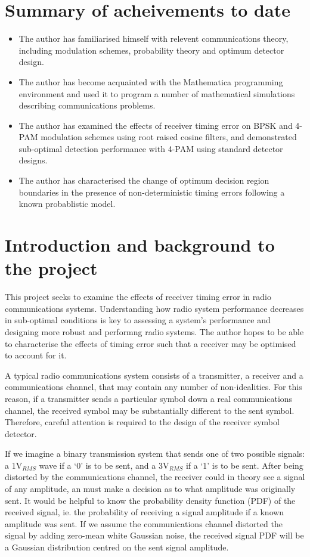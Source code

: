 \section{Summary of acheivements to date}

\begin{itemize}
\itemsep1pt\parskip0pt
\item
  The author has familiarised himself with relevent communications
  theory, including modulation schemes, probability theory and optimum
  detector design.
\item
  The author has become acquainted with the Mathematica programming
  environment and used it to program a number of mathematical
  simulations describing communications problems.
\item
  The author has examined the effects of receiver timing error on BPSK
  and 4-PAM modulation schemes using root raised cosine filters, and
  demonstrated sub-optimal detection performance with 4-PAM using
  standard detector designs.
\item
  The author has characterised the change of optimum decision region
  boundaries in the presence of non-deterministic timing errors
  following a known probablistic model.
\end{itemize}

\section{Introduction and background to the project}

This project seeks to examine the effects of receiver timing error in
radio communications systems. Understanding how radio system performance
decreases in sub-optimal conditions is key to assessing a system's
performance and designing more robust and performng radio systems. The
author hopes to be able to characterise the effects of timing error such
that a receiver may be optimised to account for it.

A typical radio communications system consists of a transmitter, a
receiver and a communications channel, that may contain any number of
non-idealities. For this reason, if a transmitter sends a particular
symbol down a real communications channel, the received symbol may be
substantially different to the sent symbol. Therefore, careful attention
is required to the design of the receiver symbol detector.

If we imagine a binary transmission system that sends one of two
possible signals: a 1V$_{RMS}$ wave if a `0' is to be sent, and a
3V$_{RMS}$ if a `1' is to be sent. After being distorted by the
communications channel, the receiver could in theory see a signal of any
amplitude, an must make a decision as to what amplitude was originally
sent. It would be helpful to know the probability density function (PDF)
of the received signal, ie. the probability of receiving a signal
amplitude if a known amplitude was sent. If we assume the communications
channel distorted the signal by adding zero-mean white Gaussian noise,
the received signal PDF will be a Gaussian distribution centred on the
sent signal amplitude.

